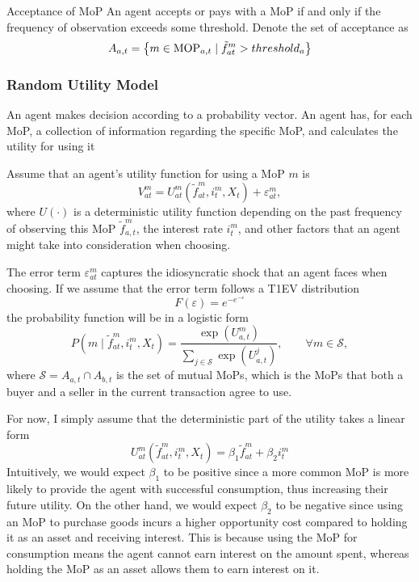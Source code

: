 \begin{definition}
   {Acceptance of MoP}
   An agent accepts or pays with a MoP if and only if the frequency of
   observation exceeds some threshold. Denote the set of acceptance as
   \begin{equation}
      A_{a,t} = \left\{ m \in \mathrm{MOP}_{a,t} \mid \tilde{f}^m_{at}>threshold_a\right\}
   \end{equation}
\end{definition}

\subsubsection*{Random Utility Model}

An agent makes decision according to a probability vector. An agent has, for
each MoP, a collection of information regarding the specific MoP, and calculates
the utility for using it \citep*{Csik96,Matsatsinis00,Trade_ABM_MOP2006}

Assume that an agent's utility function for using a MoP $m$ is
\begin{equation}
   V^m_{at} = U^m_{at}(\tilde{f}^m_{at}, i^m_t, X_t) + \varepsilon^m_{at} ,
\end{equation}
where $U(\cdot)$ is a deterministic utility function depending on the past
frequency of observing this MoP $\tilde{f}^m_{a,t}$, the interest rate $i^m_t$,
and other factors that an agent might take into consideration when choosing.

The error term $\varepsilon^m_{at}$ captures the idiosyncratic shock that an
agent faces when choosing. If we assume
that the error term follows a T1EV distribution
\begin{equation*}
   F(\varepsilon) = e^{-e^{-\varepsilon}}
\end{equation*}
the probability function will be in a logistic form \citep*{McFadden74}
\begin{equation}
   P(m \mid \tilde{f}^m_{at}, i^m_t, X_t) =
      \frac{\exp(U^m_{a,t})}
      {
         \sum_{j \in \mathcal{S}} \exp(U^j_{a,t})
      },\qquad \forall m \in \mathcal{S},
\end{equation}
where $\mathcal{S} = A_{a,t} \cap A_{b,t}$ is the set of mutual MoPs, which is
the MoPs that both a buyer and a seller in the current transaction agree to use.

For now, I simply assume that the deterministic part of the utility takes a
linear form
\begin{equation}
   U^m_{at}(\tilde{f}^m_{at}, i^m_t, X_t) = \beta_1 \tilde{f}^m_{at} + \beta_2 i^m_t
\end{equation}
Intuitively, we would expect $\beta_1$ to be positive since a more common MoP is
more likely to provide the agent with successful consumption, thus increasing
their future utility. On the other hand, we would expect $\beta_2$ to be
negative since using an MoP to purchase goods incurs a higher opportunity cost
compared to holding it as an asset and receiving interest. This is because using
the MoP for consumption means the agent cannot earn interest on the amount
spent, whereas holding the MoP as an asset allows them to earn interest on it.

